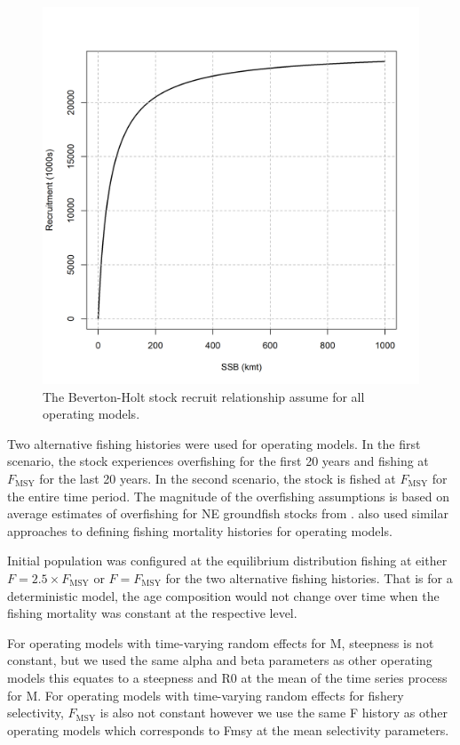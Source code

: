\documentclass[
  12pt,
]{article}
\newcommand{\Fmsy}{\ensuremath{F_{\text{MSY}}}\xspace}
\begin{document}
\begin{figure}
\caption{The Beverton-Holt stock recruit relationship assume for all operating models.}\label{om_sr}
\begin{center}
\includegraphics[width = \textwidth]{om_sr.png}
\end{center}
\end{figure}

Two alternative fishing histories were used for operating models. In the
first scenario, the stock experiences overfishing for the first 20 years
and fishing at \Fmsy for the last 20 years. In the second scenario, the
stock is fished at \Fmsy for the entire time period. The magnitude of
the overfishing assumptions is based on average estimates of overfishing
for NE groundfish stocks from \citet{wiedenmannetal19}.
 also used similar approaches to defining fishing
mortality histories for operating models.

Initial population was configured at the equilibrium distribution
fishing at either \(F = 2.5\times \Fmsy\) or \(F = \Fmsy\) for the two
alternative fishing histories. That is for a deterministic model, the
age composition would not change over time when the fishing mortality
was constant at the respective level.

For operating models with time-varying random effects for M, steepness
is not constant, but we used the same alpha and beta parameters as other
operating models this equates to a steepness and R0 at the mean of the
time series process for M. For operating models with time-varying random
effects for fishery selectivity, \Fmsy is also not constant however we
use the same F history as other operating models which corresponds to
Fmsy at the mean selectivity parameters.
\end{document}
